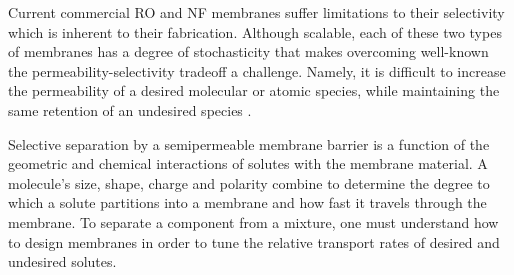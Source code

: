 \documentclass[journal=jpcbfk,manusciprt=article]{achemso}
\begin{document}


  Current commercial RO and NF membranes suffer limitations to their selectivity 
  which is inherent to their fabrication. Although scalable, each of these two types
  of membranes has a degree of stochasticity that makes overcoming well-known the 
  permeability-selectivity tradeoff a challenge. Namely, it is difficult to increase
  the permeability of a desired molecular or atomic species, while maintaining the same 
  retention of an undesired species \cite{werber_materials_2016}. 


  Selective separation by a semipermeable membrane barrier is a function of the
  geometric and chemical interactions of solutes with the membrane material. A
  molecule's size, shape, charge and polarity combine to determine the degree to
  which a solute partitions into a membrane and how fast it travels through the
  membrane. To separate a component from a mixture, one must understand how to
  design membranes in order to tune the relative transport rates of desired and
  undesired solutes\cite{gin_polymerized_2008,wijmans_solution-diffusion_1995}. 
\end{document}
